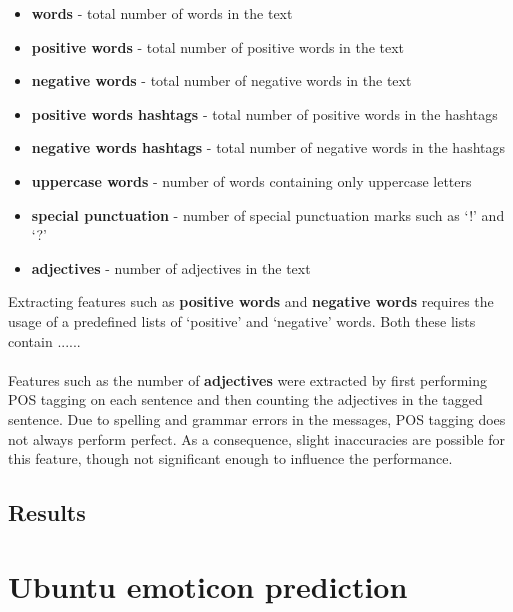 \documentclass{article}
\begin{document}
\begin{itemize}
\item \textbf{words} - total number of words in the text
\item \textbf{positive words} - total number of positive words in the text
\item \textbf{negative words} - total number of negative words in the text
\item \textbf{positive words hashtags} - total number of positive words in the hashtags
\item \textbf{negative words hashtags} - total number of negative words in the hashtags
\item \textbf{uppercase words} - number of words containing only uppercase letters
\item \textbf{special punctuation} - number of special punctuation marks such as `!' and `?'
\item \textbf{adjectives} - number of adjectives in the text 
\end{itemize}

\noindent Extracting features such as \textbf{positive words} and \textbf{negative words} requires the usage of a predefined lists of `positive' and `negative' words. Both these lists contain ...... %
\\
\\
Features such as the number of \textbf{adjectives} were extracted by first performing POS tagging on each sentence and then counting the adjectives in the tagged sentence. Due to spelling and grammar errors in the messages, POS tagging does not always perform  perfect. As a consequence, slight inaccuracies are possible for this feature, though not significant enough to influence the performance.



\subsection{Results}

\pagebreak



\section{Ubuntu emoticon prediction}
\end{document}
